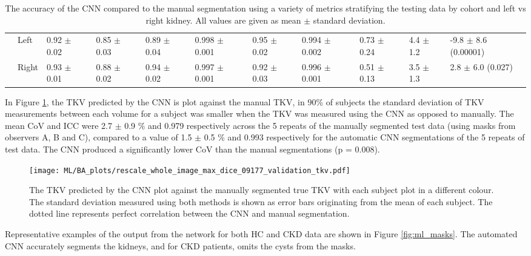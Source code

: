 \begin{landscape}
\begin{table}[H]
\begin{adjustbox}{width=\hsize, center}
\begin{tabularx}{1.3\hsize}{XX||X|X|X|X|X|X|X|X|X}
		& Left   & 0.92 $\pm$ 0.02   & 0.85 $\pm$ 0.03     & 0.89 $\pm$ 0.04   & 0.998 $\pm$ 0.001   & 0.95 $\pm$ 0.02   & 0.994 $\pm$ 0.002   & 0.73 $\pm$ 0.24                  & 4.4 $\pm$ 1.2                                 & -9.8 $\pm$ 8.6   (0.00001) \\ \cline{2-11} 
		& Right  & 0.93 $\pm$   0.01 & 0.88 $\pm$   0.02   & 0.94 $\pm$   0.02 & 0.997   $\pm$ 0.001 & 0.92 $\pm$   0.03 & 0.996   $\pm$ 0.001 & 0.51 $\pm$   0.13                & 3.5 $\pm$   1.3                               & 2.8 $\pm$   6.0 (0.027)   
	\end{tabularx}
	\end{adjustbox}
	\caption{The accuracy of the \ac{CNN} compared to the manual segmentation using a variety of metrics stratifying the testing data by cohort and left vs right kidney. All values are given as mean $\pm$ standard deviation. }
	\label{tab:ml_testing_metrics}
\end{table}
\end{landscape}

In Figure \ref{fig:ml_testing_corr}, the \ac{TKV} predicted by the CNN is plot against the manual \ac{TKV}, in 90\% of subjects the standard deviation of \ac{TKV} measurements between each volume for a subject was smaller when the \ac{TKV} was measured using the \ac{CNN} as opposed to manually. The mean \ac{CoV} and \ac{ICC} were 2.7 $\pm$ 0.9 \% and 0.979 respectively across the 5 repeats of the manually segmented test data (using masks from observers A, B and C), compared to a value of 1.5 $\pm$ 0.5 \% and 0.993 respectively for the automatic \ac{CNN} segmentations of the 5 repeats of test data. The \ac{CNN} produced a significantly lower \ac{CoV} than the manual segmentations (p = 0.008).

\begin{figure}[H]
	\centering
	\texttt{[image: ML/BA\_plots/rescale\_whole\_image\_max\_dice\_09177\_validation\_tkv.pdf]}
	\caption{The \ac{TKV} predicted by the \ac{CNN} plot against the manually segmented true \ac{TKV} with each subject plot in a different colour. The standard deviation measured using both methods is shown as error bars originating from the mean of each subject. The dotted line represents perfect correlation between the \ac{CNN} and manual segmentation.}
	\label{fig:ml_testing_corr}	
\end{figure}

Representative examples of the output from the network for both \ac{HC} and \ac{CKD} data are shown in Figure \ref{fig:ml_masks}. The automated \ac{CNN} accurately segments the kidneys, and for \ac{CKD} patients, omits the cysts from the masks. 

